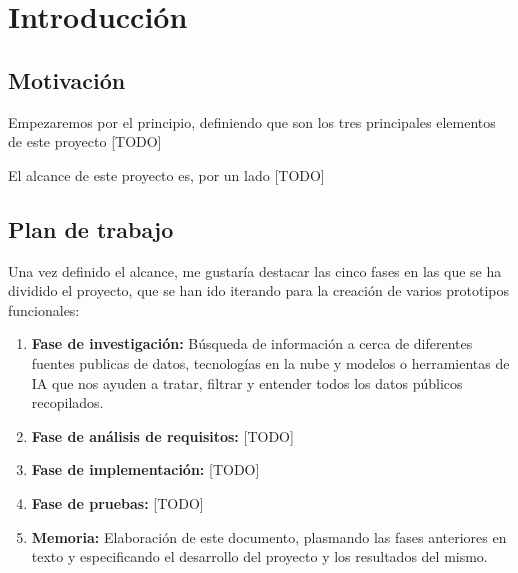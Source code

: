 \chapter{Introducción}
\label{cap:introduccion}


\section{Motivación}

Empezaremos por el principio, definiendo que son los tres principales elementos de este proyecto [TODO]


El alcance de este proyecto es, por un lado [TODO]

\section{Plan de trabajo}


Una vez definido el alcance, me gustaría destacar las cinco fases en las que se ha dividido el proyecto, que se han ido iterando para la creación de varios prototipos funcionales:


\begin{enumerate}
	\item \textbf{Fase de investigación:} Búsqueda de información a cerca de diferentes fuentes publicas de datos,  tecnologías en la nube y modelos o herramientas de IA que nos ayuden a tratar, filtrar y entender todos los datos públicos recopilados.
	
	\item \textbf{Fase de análisis de requisitos:} [TODO]
	
	\item \textbf{Fase de implementación:} [TODO]
	
	\item \textbf{Fase de pruebas:} [TODO]
	
	\item \textbf{Memoria:} Elaboración de este documento, plasmando las fases anteriores en texto y especificando el desarrollo del proyecto y los resultados del mismo.
\end{enumerate}

